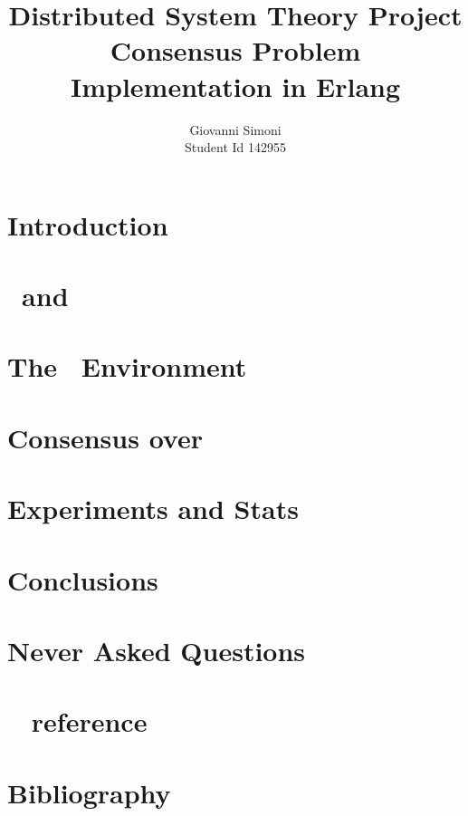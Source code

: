 \documentclass[a4paper]{article}
\title{Distributed System Theory Project \\
       Consensus Problem \\
       Implementation in Erlang}
\author{Giovanni Simoni\\ Student Id 142955}
\begin{document}
    \maketitle
    \newpage

    \tableofcontents
    \newpage

    \section{Introduction} \label{sec:Introduction}
    

    \section{\Erlang\ and \OTP} \label{sec:erlang-and-otp}
    

    \section{The \YUNA\ Environment} \label{sec:the-yuna-environment}
    

    \section{Consensus over \YUNA}
    

    \section{Experiments and Stats}
    

    \section{Conclusions}
    

    \section{Never Asked Questions}
    


    \section{\YUNA\  reference} \label{sec:yuna-api-reference}
    

    \section{Bibliography}
    
\end{document}
